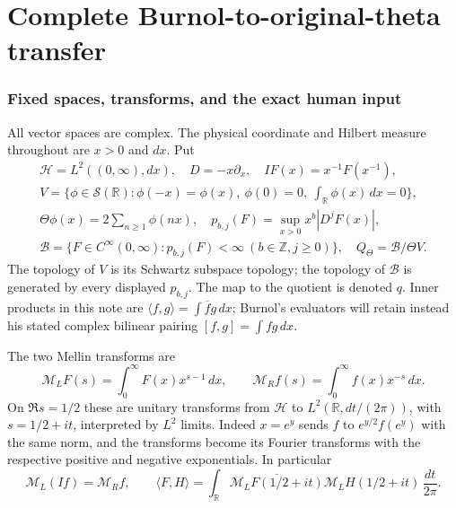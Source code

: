 \endgroup

\clearpage\begingroup
\part*{Complete Burnol-to-original-theta transfer}
\newtheorem{mburntheorem}{Theorem}[section]
\newtheorem{mburnproposition}[mburntheorem]{Proposition}
\newtheorem{mburnlemma}[mburntheorem]{Lemma}
\newtheorem{mburncorollary}[mburntheorem]{Corollary}
\newcommand{\mburnC}{\mathbb C}\newcommand{\mburnR}{\mathbb R}
\newcommand{\mburnB}{\mathscr B}\newcommand{\mburnHH}{\mathcal H}
\newcommand{\mburnML}{\mathcal M_{\!L}}\newcommand{\mburnMR}{\mathcal M_{\!R}}
\newcommand{\mburnPP}{\mathcal P}\newcommand{\mburnFc}{\mathcal F_+}
\newcommand{\mburnnorm}[1]{\left\lVert#1\right\rVert}


\section{Fixed spaces, transforms, and the exact human input}

All vector spaces are complex. The physical coordinate and Hilbert
measure throughout are $x>0$ and $dx$. Put
\begin{equation}\label{mburn:eq:objects}
\begin{gathered}
 \mburnHH=L^2((0,\infty),dx),\quad D=-x\partial_x,\quad
 IF(x)=x^{-1}F(x^{-1}),\\
 V=\{\phi\in\mathcal S(\mburnR):\phi(-x)=\phi(x),\ 
       \phi(0)=0,\ \int_\mburnR\phi(x)\,dx=0\},\\
 \Theta\phi(x)=2\sum_{n\geq1}\phi(nx),\quad
 p_{b,j}(F)=\sup_{x>0}x^b|D^jF(x)|,\\
 \mburnB=\{F\in C^\infty(0,\infty):p_{b,j}(F)<\infty
                          \ (b\in\mathbb Z,j\geq0)\},
 \quad Q_\Theta=\mburnB/\Theta V.
\end{gathered}
\end{equation}
The topology of $V$ is its Schwartz subspace topology; the topology
of $\mburnB$ is generated by every displayed $p_{b,j}$. The map to the
quotient is denoted $q$. Inner products in this note are
$\langle f,g\rangle=\int\overline f g\,dx$; Burnol's evaluators will
retain instead his stated complex bilinear pairing
$[f,g]=\int fg\,dx$.

The two Mellin transforms are
\begin{equation}\label{mburn:eq:mellin}
 \mburnML F(s)=\int_0^\infty F(x)x^{s-1}\,dx,\qquad
 \mburnMR f(s)=\int_0^\infty f(x)x^{-s}\,dx.
\end{equation}
On $\Re s=1/2$ these are unitary transforms from $\mburnHH$ to
$L^2(\mburnR,dt/(2\pi))$, with $s=1/2+it$, interpreted by $L^2$
limits. Indeed $x=e^y$ sends $f$ to $e^{y/2}f(e^y)$ with the same
norm, and the transforms become its Fourier transforms with the
respective positive and negative exponentials. In particular
\begin{equation}\label{mburn:eq:parseval}
 \mburnML(If)=\mburnMR f,\qquad
 \langle F,H\rangle=\int_\mburnR
       \overline{\mburnML F(1/2+it)}\mburnML H(1/2+it)\,\frac{dt}{2\pi}.
\end{equation}

